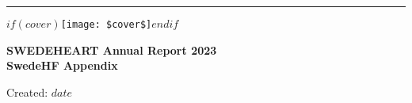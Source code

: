 
\rule{\textwidth}{1pt} %
\vspace{0.1\textheight} %

\centering %

$if(cover)$\texttt{[image: \$cover\$]}$endif$

\vspace{0.15\textheight}

{\huge\bfseries\nohyphens{SWEDEHEART Annual Report 2023}}\\[2\baselineskip] 
{\huge\bfseries\nohyphens{SwedeHF Appendix}}\\[2\baselineskip] 



\vspace{0.25\textheight}

\raggedright{Created: $date$}
